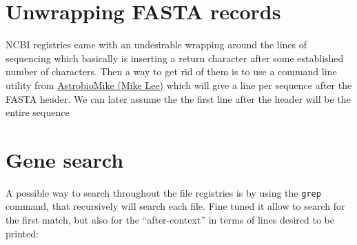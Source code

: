 \documentclass[
  letterpaper,
  DIV=11,
  numbers=noendperiod]{scrreprt}
\newenvironment{Shaded}{\begin{snugshade}}{\end{snugshade}}
\newcommand{\AttributeTok}[1]{\textcolor[rgb]{0.40,0.46,0.14}{#1}}
\newcommand{\ControlFlowTok}[1]{\textcolor[rgb]{0.00,0.46,0.62}{#1}}
\newcommand{\DataTypeTok}[1]{\textcolor[rgb]{0.68,0.00,0.00}{#1}}
\newcommand{\FunctionTok}[1]{\textcolor[rgb]{0.28,0.35,0.67}{#1}}
\newcommand{\KeywordTok}[1]{\textcolor[rgb]{0.00,0.46,0.62}{#1}}
\newcommand{\NormalTok}[1]{\textcolor[rgb]{0.00,0.46,0.62}{#1}}
\newcommand{\OperatorTok}[1]{\textcolor[rgb]{0.37,0.37,0.37}{#1}}
\newcommand{\PreprocessorTok}[1]{\textcolor[rgb]{0.68,0.00,0.00}{#1}}
\newcommand{\StringTok}[1]{\textcolor[rgb]{0.13,0.47,0.30}{#1}}
\newcommand{\VariableTok}[1]{\textcolor[rgb]{0.07,0.07,0.07}{#1}}
\begin{document}
\hypertarget{unwrapping-fasta-records}{%
\section*{Unwrapping FASTA records}\label{unwrapping-fasta-records}}

NCBI registries came with an undesirable wrapping around the lines of
sequencing which basically is inserting a return character after some
established number of characters. Then a way to get rid of them is to
use a command line utility from
\href{https://github.com/AstrobioMike}{AstrobioMike (Mike Lee)} which
will give a line per sequence after the FASTA header. We can later
assume the the first line after the header will be the entire sequence

\begin{Shaded}
\end{Shaded}

\hypertarget{gene-search}{%
\section*{Gene search}\label{gene-search}}

A possible way to search throughout the file registries is by using the
\texttt{grep} command, that recursively will search each file. Fine
tuned it allow to search for the first match, but also for the
``after-context'' in terms of lines desired to be printed:

\begin{Shaded}
\end{Shaded}
\end{document}
